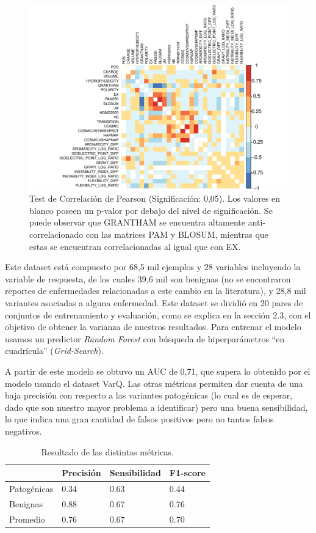 \begin{figure}[H]
    \centering
    \includegraphics[scale=0.8]{documents/latex/figures/3/corrplot_1.pdf}
    \caption{Test de Correlación de Pearson (Significación: 0,05). Los valores en blanco poseen un p-valor por debajo del nivel de significación. Se puede observar que GRANTHAM se encuentra altamente anti-correlacionado con las matrices PAM y BLOSUM, mientras que estas se encuentran correlacionadas al igual que con EX.}
    \label{fig:corrplot_1}
\end{figure}

Este dataset está compuesto por 68,5 mil ejemplos y 28 variables incluyendo la variable de respuesta, de los cuales 39,6 mil son benignas (no se encontraron reportes de enfermedades relacionadas a este cambio en la literatura), y 28,8 mil variantes asociadas a alguna enfermedad. Este dataset se dividió en 20 pares de conjuntos de entrenamiento y evaluación, como se explica en la sección 2.3, con el objetivo de obtener la varianza de nuestros resultados. 
Para entrenar el modelo usamos un predictor \textit{Random Forest} con búsqueda de hiperparámetros ``en cuadrícula'' (\textit{Grid-Search}). 

A partir de este modelo se obtuvo un AUC de 0,71, que supera lo obtenido por el modelo usando el dataset VarQ. Las otras métricas permiten dar cuenta de una baja precisión con respecto a las variantes patogénicas (lo cual es de esperar, dado que son nuestro mayor problema a identificar) pero una buena sensibilidad, lo que indica una gran cantidad de falsos positivos pero no tantos falsos negativos.

\begin{table}[H]
\centering
\begin{tabular}{|l|l|l|l|}
\hline
              & Precisión & Sensibilidad & F1-score \\ \hline
Patogénicas   & 0.34      & 0.63   & 0.44     \\ \hline
Benignas      & 0.88      & 0.67   & 0.76     \\ \hline
Promedio      & 0.76      & 0.67   & 0.70     \\ \hline
\end{tabular}
\caption{Resultado de las distintas métricas.}
\label{my-label}
\end{table}

